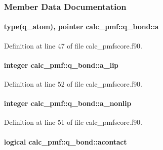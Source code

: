\subsubsection{Member Data Documentation}
\hypertarget{structcalc__pmf_1_1q__bond_a6ab75e023ec886577d2a9d1ec2312941}{
\paragraph[{a}]{\setlength{\rightskip}{0pt plus 5cm}type({\bf q\-\_\-atom}), pointer calc\-\_\-pmf\-::q\-\_\-bond\-::a}}\label{structcalc__pmf_1_1q__bond_a6ab75e023ec886577d2a9d1ec2312941}


Definition at line 47 of file calc\-\_\-pmfscore.\-f90.

\hypertarget{structcalc__pmf_1_1q__bond_a291994e6e8ce394bca92d8b5889d4c59}{
\paragraph[{a\-\_\-lip}]{\setlength{\rightskip}{0pt plus 5cm}integer calc\-\_\-pmf\-::q\-\_\-bond\-::a\-\_\-lip}}\label{structcalc__pmf_1_1q__bond_a291994e6e8ce394bca92d8b5889d4c59}


Definition at line 52 of file calc\-\_\-pmfscore.\-f90.

\hypertarget{structcalc__pmf_1_1q__bond_a7c5b1ee01d34822352583b44d2cf25b2}{
\paragraph[{a\-\_\-nonlip}]{\setlength{\rightskip}{0pt plus 5cm}integer calc\-\_\-pmf\-::q\-\_\-bond\-::a\-\_\-nonlip}}\label{structcalc__pmf_1_1q__bond_a7c5b1ee01d34822352583b44d2cf25b2}


Definition at line 51 of file calc\-\_\-pmfscore.\-f90.

\hypertarget{structcalc__pmf_1_1q__bond_a7588c68c163c5d407c29559ca5e766c3}{
\paragraph[{acontact}]{\setlength{\rightskip}{0pt plus 5cm}logical calc\-\_\-pmf\-::q\-\_\-bond\-::acontact}}\label{structcalc__pmf_1_1q__bond_a7588c68c163c5d407c29559ca5e766c3}


